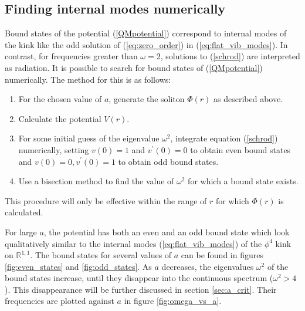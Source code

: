 \subsection{Finding internal modes numerically}
\label{sec:finding_bound_states_numerically}
Bound states of the potential (\ref{QMpotential}) correspond to internal modes of the kink like the odd solution of (\ref{eq:zero_order}) in (\ref{eq:flat_vib_modes}). In contrast, for frequencies greater than $\omega = 2$, solutions to (\ref{schrod}) are interpreted as radiation. It is possible to search for bound states of (\ref{QMpotential}) numerically. The method for this is as follows:
\begin{enumerate}
\item For the chosen value of $a$, generate the soliton $\Phi(r)$ as described above.
\item Calculate the potential $V(r)$.
\item For some initial guess of the eigenvalue $\omega^2$, integrate equation ({\ref{schrod}}) numerically, setting $v(0)=1$ and $v^\prime (0)=0$ to obtain even bound states and $v(0)=0,v^\prime(0)=1$ to obtain odd bound states.
\item Use a bisection method to find the value of $\omega^2$ for which a bound state exists.
\end{enumerate}
This procedure will only be effective within the range of $r$ for which $\Phi(r)$ is calculated.

For large $a$, the potential has both an even and an odd bound state which look qualitatively similar to the internal modes (\ref{eq:flat_vib_modes}) of the $\phi^4$ kink on $\mathbb{R}^{1,1}$. The bound states for several values of $a$ can be found in figures \ref{fig:even_states} and \ref{fig:odd_states}. As $a$ decreases, the eigenvalues $\omega^2$ of the bound states increase, until they disappear into the continuous spectrum ($\omega^2>4$). This disappearance will be further discussed in section \ref{sec:a_crit}. Their frequencies are plotted against $a$ in figure \ref{fig:omega_vs_a}.


